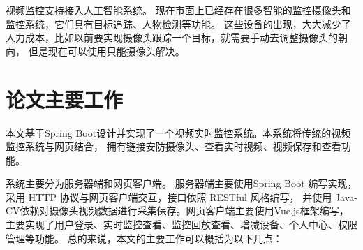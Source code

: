 
视频监控支持接入人工智能系统。
现在市面上已经存在很多智能的监控摄像头和监控系统，它们具有目标追踪、人物检测等功能。
这些设备的出现，大大减少了人力成本，比如以前要实现摄像头跟踪一个目标，就需要手动去调整摄像头的朝向，
但是现在可以使用只能摄像头解决。

\section{论文主要工作}
本文基于Spring Boot设计并实现了一个视频实时监控系统。本系统将传统的视频监控系统与网页结合，
拥有链接安防摄像头、查看实时视频、视频保存和查看功能。

系统主要分为服务器端和网页客户端。
服务器端主要使用Spring Boot 编写实现，采用 HTTP 协议与网页客户端交互，接口依照 RESTful 风格编写，
并使用 Java-CV依赖对摄像头视频数据进行采集保存。网页客户端主要使用Vue.js框架编写，主要实现了用户登录、实时监控查看、监控回放查看、增减设备、个人中心、权限管理等功能。
总的来说，本文的主要工作可以概括为以下几点：

